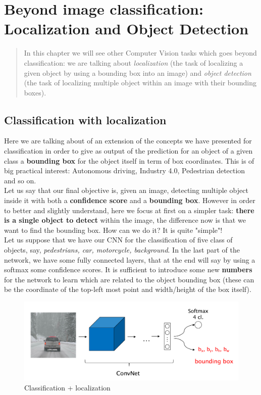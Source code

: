 \chapter[Localization and Object Detection]{Beyond image classification: Localization and Object Detection}

\begin{quotation}
    \noindent
    \textsf{In this chapter we will see other Computer Vision tasks which goes beyond classification: we are talking about \textit{localization} (the task of localizing a given object by using a bounding box into an image) and \textit{object detection} (the task of localizing multiple object within an image with their bounding boxes).
    }
\end{quotation}

\section{Classification with localization}
Here we are talking about of an extension of the concepts we have presented for classification in order to give as output of the prediction for an object of a given class a \textbf{bounding box} for the object itself in term of box coordinates. This is of big practical interest: Autonomous driving, Industry 4.0, Pedestrian detection and so on.\\
Let us say that our final objective is, given an image, detecting multiple object inside it with both a \textbf{confidence score} and a \textbf{bounding box}. However in order to better and slightly understand, here we focus at first on a simpler task: \textbf{there is a single object to detect} within the image, the difference now is that we want to find the bounding box. How can we do it? It is quite "simple"! \\
Let us suppose that we have our CNN for the classification of five class of objects, say, \textit{pedestrians, car, motorcycle, background}. In the last part of the network, we have some fully connected layers, that at the end will say by using a softmax some confidence scores. It is sufficient to introduce some new \textbf{numbers} for the network to learn which are related to the object bounding box (these can be the coordinate of the top-left most point and width/height of the box itself). 

\begin{figure}
    \centering
    \includegraphics[scale=0.5]{img/CNN_localization.png}
    \caption{Classification + localization}
\end{figure}

